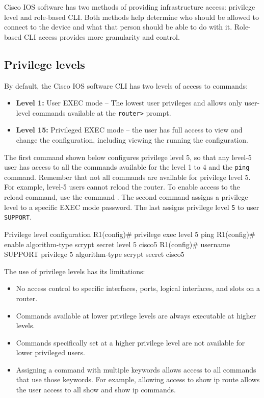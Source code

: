 Cisco IOS software has two methods of providing infrastructure access: privilege level and role-based CLI. Both methods help determine who should be allowed to connect to the device and what that person should be able to do with it. Role-based CLI access provides more granularity and control.

\subsection{Privilege levels}

By default, the Cisco IOS software CLI has two levels of access to commands:

\begin{itemize}
\item \textbf{Level 1:} User EXEC mode -- The lowest user privileges and allows only user-level commands available at the \verb|router>| prompt.
\item \textbf{Level 15:} Privileged EXEC mode -- the user has full access to view and change the configuration, including viewing the running the configuration.
\end{itemize}

The first command shown below configures privilege level 5, so that any level-5 user has access to all the commands available for the level 1 to 4 and the \texttt{ping} command. Remember that not all commands are available for privilege level 5. For example, level-5 users cannot reload the router. To enable access to the reload command, use the command . The second command assigns a privilege level to a specific EXEC mode password. The last assigns privilege level \texttt{5} to user \texttt{SUPPORT}. 

\begin{sexylisting}{Privilege level configuration}
R1(config)# privilege exec level 5 ping 
R1(config)# enable algorithm-type scrypt secret level 5 cisco5
R1(config)# username SUPPORT privilege 5 algorithm-type scrypt secret cisco5
\end{sexylisting}

The use of privilege levels has its limitations:

\begin{itemize}
\item No access control to specific interfaces, ports, logical interfaces, and slots on a router.
\item Commands available at lower privilege levels are always executable at higher levels.
\item Commands specifically set at a higher privilege level are not available for lower privileged users.
\item Assigning a command with multiple keywords allows access to all commands that use those keywords. For example, allowing access to show ip route allows the user access to all show and show ip commands.
\end{itemize}

